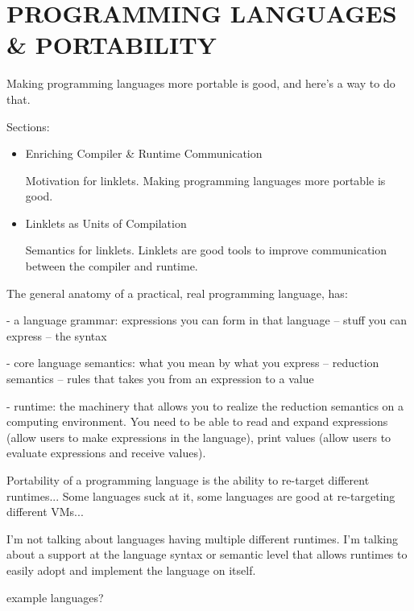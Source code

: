 \chapter[\texorpdfstring{PROGRAMMING LANGUAGES \& PORTABILITY}
                          {Linklets}]{PROGRAMMING LANGUAGES \& PORTABILITY}
\label{chapter:linklets}

	\begin{chaptersynopsis}

        Making programming languages more portable is good, and here's a way to do that.

        \vspace{2em}

        Sections:
		\begin{itemize}
			\item Enriching Compiler \& Runtime Communication

                Motivation for linklets. Making programming languages more portable is good.
			\item Linklets as Units of Compilation

                Semantics for linklets. Linklets are good tools to improve communication between the compiler and runtime.
		\end{itemize}
    \end{chaptersynopsis}

	\begin{paragraph-here}
		The general anatomy of a practical, real programming language, has:

			- a language grammar: expressions you can form in that language -- stuff you can express -- the syntax

			- core language semantics: what you mean by what you express -- reduction semantics -- rules that takes you from an expression to a value

			- runtime: the machinery that allows you to realize the reduction semantics on a computing environment. You need to be able to read and expand expressions (allow users to make expressions in the language), print values (allow users to evaluate expressions and receive values).
	\end{paragraph-here}

	\begin{paragraph-here}
		Portability of a programming language is the ability to re-target different runtimes... Some languages suck at it, some languages are good at re-targeting different VMs...

		I'm not talking about languages having multiple different runtimes. I'm talking about a support at the language syntax or semantic level that allows runtimes to easily adopt and implement the language on itself.

		\begin{todo}
			example languages?
		\end{todo}
	\end{paragraph-here}

